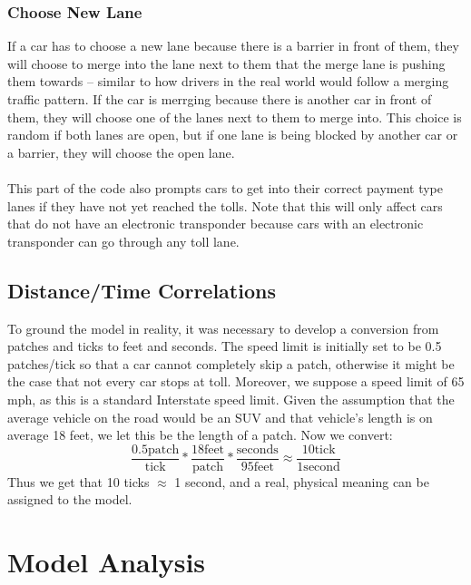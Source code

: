 \documentclass{article}
\begin{document}
\subsubsection{Choose New Lane}
If a car has to choose a new lane because there is a barrier in front of them, they will choose to merge into the lane next to them that the merge lane is pushing them towards – similar to how drivers in the real world would follow a merging traffic pattern. If the car is merrging because there is another car in front of them, they will choose one of the lanes next to them to merge into. This choice is random if both lanes are open, but if one lane is being blocked by another car or a barrier, they will choose the open lane. \\ \\
This part of the code also prompts cars to get into their correct payment type lanes if they have not yet reached the tolls. Note that this will only affect cars that do not have an electronic transponder because cars with an electronic transponder can go through any toll lane.

\subsection{Distance/Time Correlations}
To ground the model in reality, it was necessary to develop a conversion from patches and ticks to feet and seconds. The speed limit is initially set to be 0.5 patches/tick so that a car cannot completely skip a patch, otherwise it might be the case that not every car stops at toll. Moreover, we suppose a speed limit of 65 mph, as this is a standard Interstate speed limit. Given the assumption that the average vehicle on the road would be an SUV and that vehicle's length is on average 18 feet, we let this be the length of a patch. Now we convert:
\begin{equation*}
    \frac{0.5 \text{patch}}{\text{tick}} * \frac{18 \text{feet}}{\text{patch}} * \frac{\text{seconds}}{95 \text{feet}} \approx \frac{10 \text{tick}}{1 \text{second}}
\end{equation*}
Thus we get that 10 ticks $\approx$ 1 second, and a real, physical meaning can be assigned to the model.

\section{Model Analysis}
\end{document}
